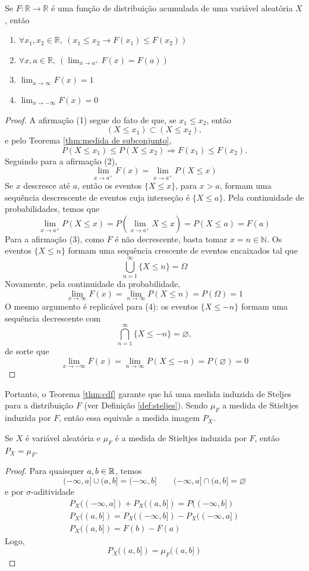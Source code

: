 \begin{thm:cdf}
\label{thm:cdf}
Se $F: \mathbb{R} \to \mathbb{R}$ é uma função de distribuição acumulada de uma
variável aleatória $X$, então
\begin{enumerate}
	\item $\forall x_1, x_2 \in \mathbb{R},\ (x_1 \leq x_2 \rightarrow F(x_1) \leq F(x_2))$
	\item $\forall x, a \in \mathbb{R},\ (\lim_{x \to a^+} F(x) = F(a) )$
	\item $\lim_{x \to \infty} F(x) = 1$
	\item $\lim_{x \to -\infty} F(x) = 0$
\end{enumerate}
\begin{proof}
	A afirmação (1) segue do fato de que, se $x_1 \leq x_2$, então
	\[
		(X \leq x_1) \subset (X \leq x_2),
	\]
	e pelo Teorema \ref{thm:medida de subconjunto},
	\[
		P(X \le x_1) \leq P(X \le x_2) \Longrightarrow F(x_1) \leq F(x_2).
	\]
	Seguindo para a afirmação (2),
	\[
		\lim_{x \to a^+} F(x) = \lim_{x \to a^+} P(X \leq x)
	\]
	Se $x$ descresce até $a$, então os eventos $\{X \leq x\}$, para $x > a$, formam
	uma sequência descrescente de eventos cuja interseção é $\{X \leq a\}$. Pela
	continuidade de probabilidades, temos que
	\[
		\lim_{x \to a^+} P(X \leq x) = P \left(\lim_{x \to a^+} X \leq x\right)
		= P (X \leq a) = F(a)
	\]
	Para a afirmação (3), como $F$ é não decrescente, basta tomar $x = n \in \mathbb{N}$.
	Os eventos $\{X \leq n\}$ formam uma sequência crescente de eventos encaixados tal
	que
	\[
		\bigcup_{n=1}^\infty \{X \leq n\} = \Omega
	\]
	Novamente, pela continuidade da probabilidade,
	\[
		\lim_{x \to \infty} F(x) =
		\lim_{n \to \infty} P(X \leq n) =
		P(\Omega) = 1
	\]
	O mesmo argumento é replicável para (4): os eventos $\{X \leq -n\}$ formam uma
	sequência decrescente com
	\[
		\bigcap_{n=1}^\infty \{X \leq -n\} = \varnothing,
	\]
	de sorte que
	\[
		\lim_{x \to -\infty} F(x) =
		\lim_{n \to \infty} P(X \leq -n) =
		P(\varnothing) = 0
	\]
\end{proof}
\end{thm:cdf}

Portanto, o Teorema \ref{thm:cdf} garante que há uma medida induzida de Steljes para a
distribuição $F$ (ver Definição \ref{def:steljes}).
Sendo $\mu_F$ a medida de Stieltjes induzida por $F$, então essa equivale a medida
imagem $P_X$.

\begin{prop:steltjes e fda}
\label{prop:steltjes e fda}
Se $X$ é variável aleatória e $\mu_F$ é a medida de Stieltjes induzida por $F$, então
$P_X = \mu_F$.
\begin{proof}
	Para quaisquer $a, b \in \mathbb{R}$, temos
	\[
		(-\infty, a] \cup (a, b] = (-\infty, b] \qquad (-\infty, a] \cap (a, b] = \varnothing
	\]
	e por $\sigma$-aditividade
	\begin{gather*}
		P_X((-\infty, a]) + P_X((a, b]) = P((-\infty, b]) \\
		P_X((a, b]) = P_X((-\infty, b]) - P_X((-\infty, a])\\
		P_X((a, b]) = F(b) - F(a)
	\end{gather*}
	Logo,
	\[
		P_X((a,b]) = \mu_F((a, b])
	\]
\end{proof}
\end{prop:steltjes e fda}
